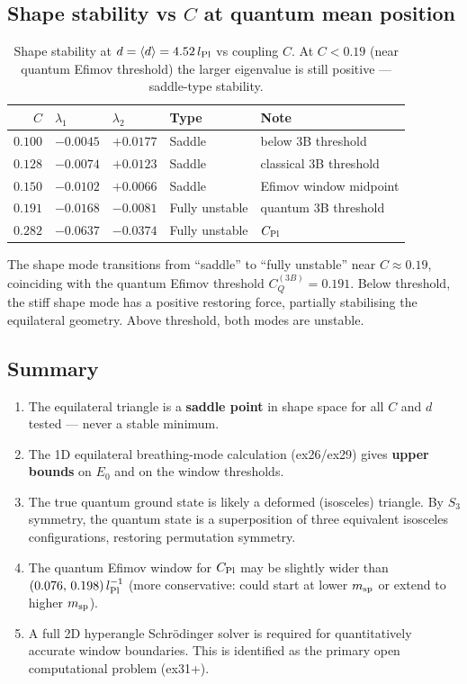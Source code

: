 \subsection{Shape stability vs \texorpdfstring{$C$}{C} at quantum mean position}

\begin{table}[h]
\centering
\caption{Shape stability at $d=\langle d\rangle=4.52\,l_{\rm Pl}$
vs coupling $C$.  At $C<0.19$ (near quantum Efimov threshold) the larger
eigenvalue is still positive — saddle-type stability.}
\label{tab:shape_vs_C}
\begin{tabular}{rllll}
\hline
$C$ & $\lambda_1$ & $\lambda_2$ & Type & Note \\
\hline
$0.100$ & $-0.0045$ & $+0.0177$ & Saddle & below 3B threshold \\
$0.128$ & $-0.0074$ & $+0.0123$ & Saddle & classical 3B threshold \\
$0.150$ & $-0.0102$ & $+0.0066$ & Saddle & Efimov window midpoint \\
$0.191$ & $-0.0168$ & $-0.0081$ & Fully unstable & quantum 3B threshold \\
$0.282$ & $-0.0637$ & $-0.0374$ & Fully unstable & $C_{\rm Pl}$ \\
\hline
\end{tabular}
\end{table}

\noindent
The shape mode transitions from ``saddle'' to ``fully unstable'' near
$C\approx0.19$, coinciding with the quantum Efimov threshold
$C_Q^{(3B)}=0.191$.  Below threshold, the stiff shape mode has a
positive restoring force, partially stabilising the equilateral geometry.
Above threshold, both modes are unstable.

\subsection{Summary}

\begin{enumerate}
\item The equilateral triangle is a \textbf{saddle point} in shape space
  for all $C$ and $d$ tested — never a stable minimum.
\item The 1D equilateral breathing-mode calculation (ex26/ex29) gives
  \textbf{upper bounds} on $E_0$ and on the window thresholds.
\item The true quantum ground state is likely a deformed (isosceles)
  triangle.  By $S_3$ symmetry, the quantum state is a superposition
  of three equivalent isosceles configurations, restoring permutation
  symmetry.
\item The quantum Efimov window for $C_{\rm Pl}$ may be slightly wider
  than $(0.076,\,0.198)\,l_{\rm Pl}^{-1}$ (more conservative: could start
  at lower $m_{\rm sp}$ or extend to higher $m_{\rm sp}$).
\item A full 2D hyperangle Schr\"odinger solver is required for
  quantitatively accurate window boundaries.  This is identified as the
  primary open computational problem (ex31+).
\end{enumerate}
